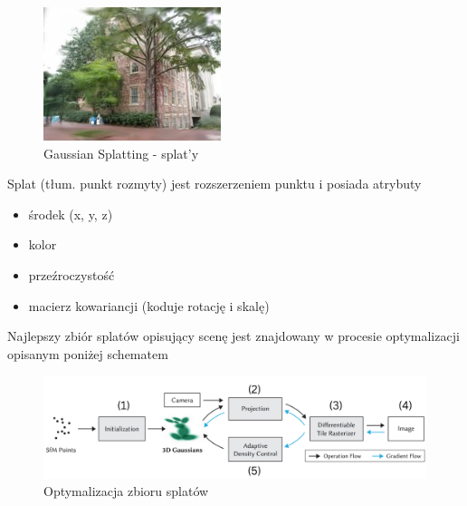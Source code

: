 \begin{figure}[!htb]
      \includegraphics[width=\linewidth]{img/gaussiansplattingobject.jpg}
      \caption{Gaussian Splatting - splat'y}\label{fig:gaussplat_example}
    \endminipage
\end{figure}

Splat (tłum. punkt rozmyty) jest rozszerzeniem punktu i posiada atrybuty
\begin{itemize}
    \item środek (x, y, z)
    \item kolor
    \item przeźroczystość
    \item macierz kowariancji (koduje rotację i skalę)
\end{itemize}

Najlepszy zbiór splatów opisujący scenę jest znajdowany w procesie optymalizacji opisanym poniżej schematem

\begin{figure}[!htb]
    \includegraphics[width=\linewidth]{img/gaussian_splatting_flow.png}
    \caption{Optymalizacja zbioru splatów}\label{fig:splatting_algorithm}
\end{figure}

